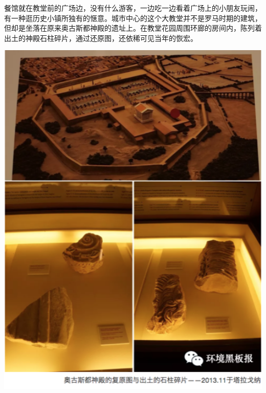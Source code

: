 \documentclass[]{book}
\begin{document}
餐馆就在教堂前的广场边，没有什么游客，一边吃一边看着广场上的小朋友玩闹，有一种逛历史小镇所独有的惬意。城市中心的这个大教堂并不是罗马时期的建筑，但却是坐落在原来奥古斯都神殿的遗址上。在教堂花园周围环廊的房间内，陈列着出土的神殿石柱碎片，通过还原图，还依稀可见当年的恢宏。

\includegraphics[width=6.35in]{images/xt37}
\end{document}
